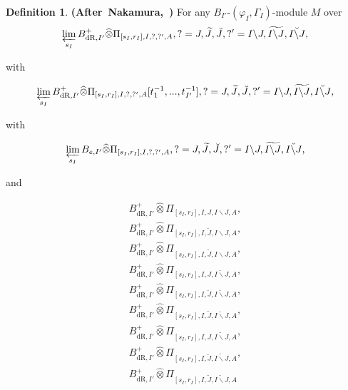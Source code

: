 \documentclass[12pt]{amsart}
\theoremstyle{definition}
\newtheorem{definition}[theorem]{Definition}
\numberwithin{equation}{section}
\begin{document}
\begin{definition}  \mbox{\bf{(After Nakamura, \cite[Appendix 5]{Nak1})}} 
For any $B_{I'}$-$(\varphi_I,\Gamma_I)$-module $M$ over 
\begin{align}
\varprojlim_{s_I}  B^+_{\mathrm{dR},I'}	\widehat{\otimes}\Pi_{[s_I,r_I],I,?,?',A},?=J,\widetilde{J},\breve{J},?'=I\backslash J,\widetilde{I\backslash J},\breve{I\backslash J},\\
\end{align}

with

\begin{align}
\varprojlim_{s_I} B^+_{\mathrm{dR},I'}	\widehat{\otimes}\Pi_{[s_I,r_I],I,?,?',A}[t_1^{-1},...,t_{I'}^{-1}],?=J,\widetilde{J},\breve{J},?'=I\backslash J,\widetilde{I\backslash J},\breve{I\backslash J},\\
\end{align}

with 

\begin{align}
\varprojlim_{s_I} B_{e,I'}	\widehat{\otimes}\Pi_{[s_I,r_I],I,?,?',A},?=J,\widetilde{J},\breve{J},?'=I\backslash J,\widetilde{I\backslash J},\breve{I\backslash J},\\
\end{align}

and


\begin{align}
B^+_{\mathrm{dR},I'}	\widehat{\otimes}\Pi_{[s_I,r_I],I,J,I\backslash J,A},\\	
B^+_{\mathrm{dR},I'}	\widehat{\otimes}\Pi_{[s_I,r_I],I,\breve{J},I\backslash J,A},\\	
B^+_{\mathrm{dR},I'}	\widehat{\otimes}\Pi_{[s_I,r_I],I,\widetilde{J},I\backslash J,A},\\
B^+_{\mathrm{dR},I'}	\widehat{\otimes}\Pi_{[s_I,r_I],I,J,\breve{I\backslash J},A},\\	
B^+_{\mathrm{dR},I'}	\widehat{\otimes}\Pi_{[s_I,r_I],I,\breve{J},\breve{I\backslash J},A},\\
B^+_{\mathrm{dR},I'}	\widehat{\otimes}\Pi_{[s_I,r_I],I,\widetilde{J},\breve{I\backslash J},A},\\
B^+_{\mathrm{dR},I'}	\widehat{\otimes}\Pi_{[s_I,r_I],I,J,\widetilde{I\backslash J},A},\\	
B^+_{\mathrm{dR},I'}	\widehat{\otimes}\Pi_{[s_I,r_I],I,\breve{J},\widetilde{I\backslash J},A},\\
B^+_{\mathrm{dR},I'}	\widehat{\otimes}\Pi_{[s_I,r_I],I,\widetilde{J},\widetilde{I\backslash J},A}
\end{align}


\end{definition}
\end{document}
